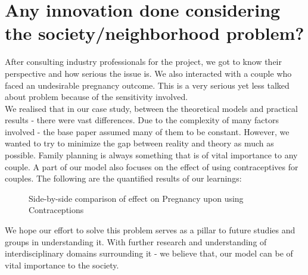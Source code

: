 \documentclass{article}
\begin{document}
\section{Any innovation done considering the society/neighborhood problem?}
After consulting industry professionals for the project, we got to know their perspective and how serious the issue is. We also interacted with a couple who faced an undesirable pregnancy outcome. This is a very serious yet less talked about problem because of the sensitivity involved. \\
We realised that in our case study, between the theoretical models and practical results - there were vast differences. Due to the complexity of many factors involved - the base paper assumed many of them to be constant. However, we wanted to try to minimize the gap between reality and theory as much as possible.\newline
Family planning is always something that is of vital importance to any couple. A part of our model also focuses on the effect of using contraceptives for couples. The following are the quantified results of our learnings: \\ 
\begin{figure}[H]%
	\centering
	\qquad
	\caption{Side-by-side comparison of effect on Pregnancy upon using Contraceptions}%
	\label{fig:example}%
\end{figure}

We hope our effort to solve this problem serves as a pillar to future studies and groups in understanding it. With further research and understanding of interdisciplinary domains surrounding it - we believe that, our model can be of vital importance to the society.  
\end{document}
